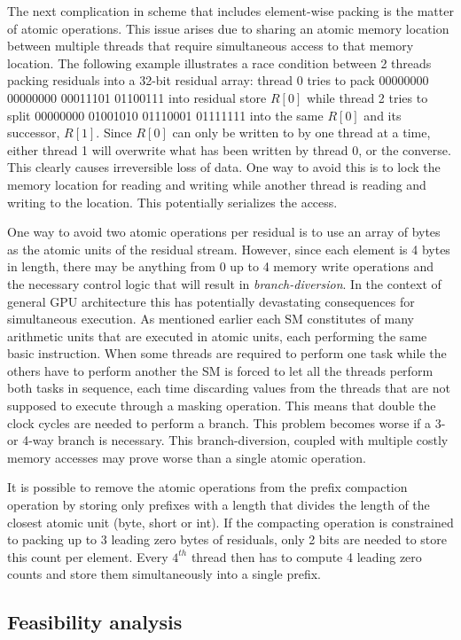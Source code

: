 The next complication in scheme that includes element-wise packing is the matter of atomic operations. This issue arises due to sharing an atomic memory location between multiple threads that require simultaneous access
 to that memory location. The following example illustrates a race condition between 2 threads packing residuals into a 32-bit residual array: thread 0 tries to pack 00000000 00000000 00011101 01100111 into residual store 
 $R[0]$ while thread 2 tries to split 00000000 01001010 01110001 01111111 into the same $R[0]$ and its successor, $R[1]$. Since $R[0]$ can only be written to by one thread at a time, either thread 1 will overwrite what has
 been written by thread 0, or the converse. This clearly causes irreversible loss of data. One way to avoid this is to lock the memory location for reading and writing while another thread is reading and writing to the 
 location. This potentially serializes the access.
 
 One way to avoid two atomic operations per residual is to use an array of bytes as the atomic units of the residual stream. However, since each element is 4 bytes in length, there may be anything from 0 up to 4 memory
 write operations and the necessary control logic that will result in \textit{branch-diversion}. In the context of general GPU architecture this has potentially devastating consequences for simultaneous execution. As mentioned
 earlier each SM constitutes of many arithmetic units that are executed in atomic units, each performing the same basic instruction. When some threads are required to perform one task while the others have to perform another the
 SM is forced to let all the threads perform both tasks in sequence, each time discarding values from the threads that are not supposed to execute through a masking operation. This means that double the clock cycles are needed
 to perform a branch. This problem becomes worse if a 3- or 4-way branch is necessary. This branch-diversion, coupled with multiple costly memory accesses may prove worse than a single atomic operation. 
 
 It is possible to remove the atomic operations from the prefix compaction operation by storing only prefixes with a length that divides the length of the closest atomic unit (byte, short or int). If the compacting operation is 
 constrained to packing up to 3 leading zero bytes of residuals, only 2 bits are needed to store this count per element. Every $4^{th}$ thread then has to compute 4 leading zero counts and store them simultaneously into a 
 single prefix.
 \subsection{Feasibility analysis}
